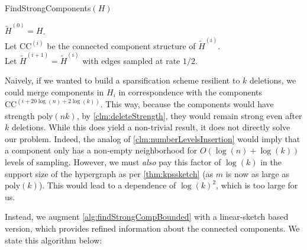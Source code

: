 \documentclass[11pt]{article}
\theoremstyle{definition}
\begin{document}
\begin{algorithm}[H]
	\caption{FindStrongComponents$(H)$}\label{alg:findStrongCompBounded}
	$\widetilde{H}^{(0)} = H$. \\
	{
		Let $\mathrm{CC}^{(i)}$ be the connected component structure of $\widetilde{H}^{(i)}$. \\
		Let $\widetilde{H}^{(i+1)} = \widetilde{H}^{(i)}$ with edges sampled at rate $1/2$. \\
	}
\end{algorithm}

Naively, if we wanted to build a sparsification scheme resilient to $k$ deletions, we could merge components in $H_i$ in correspondence with the components $\mathrm{CC}^{(i + 20 \log(n) + 2 \log(k))}$. This way, because the components would have strength $\mathrm{poly}(nk)$, by \cref{clm:deleteStrength}, they would remain strong even after $k$ deletions. While this does yield a non-trivial result, it does not directly solve our problem. Indeed, the analog of \cref{clm:numberLevelsInsertion} would imply that a component only has a non-empty neighborhood for $O(\log(n) + \log(k))$ levels of sampling. However, we must \emph{also} pay this factor of $\log(k)$ in the support size of the hypergraph as per \cref{thm:kpssketch} (as $m$ is now as large as $\mathrm{poly}(k)$). This would lead to a dependence of $\log(k)^2$, which is too large for us. 

Instead, we augment \cref{alg:findStrongCompBounded} with a linear-sketch based version, which provides refined information about the connected components. We state this algorithm below:
\end{document}
